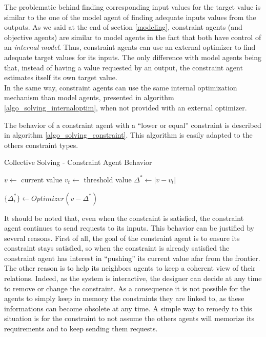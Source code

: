 The problematic behind finding corresponding input values for the target value is similar to the one of the model agent of finding adequate inputs values from the outputs. As we said at the end of section \ref{modeling}, constraint agents (and objective agents) are similar to model agents in the fact that both have control of an \emph{internal model}. Thus, constraint agents can use an external optimizer to find adequate target values for its inputs. The only difference with model agents being that, instead of having a value requested by an output, the constraint agent estimates itself its own target value.\\
In the same way, constraint agents can use the same internal optimization mechanism than model agents, presented in algorithm \ref{algo_solving_internaloptim},  when not provided with an external optimizer.

The behavior of a constraint agent with a \enquote{lower or equal} constraint is described in algorithm \ref{algo_solving_constraint}. This algorithm is easily adapted to the others constraint types.

\begin{algorithm}
\caption{Collective Solving - Constraint Agent Behavior}
\label{algo_solving_constraint}

$v \leftarrow $ current value\;
$v_t \leftarrow $ threshold value\;
$\Delta^* \leftarrow |v - v_t|$\;

\BlankLine
$\{ \Delta^*_i \} \leftarrow Optimizer(v - \Delta^*)$\;
\end{algorithm}

It should be noted that, even when the constraint is satisfied, the constraint agent continues to send requests to its inputs. This behavior can be justified by several reasons.  First of all, the goal of the constraint agent is to ensure its constraint stays satisfied, so when the constraint is already  satisfied the constraint agent has interest in \enquote{pushing} its current value afar from the frontier.\\
The other reason is to help its neighbors agents to keep a coherent view of their relations. Indeed, as the system is interactive, the designer can decide at any time to remove or change the constraint. As a consequence it is not possible for the agents to simply keep in memory the constraints they are linked to, as these informations can become obsolete at any time. A simple way to remedy to this situation is for the constraint to not assume the others agents will memorize its requirements and to keep sending them requests.

